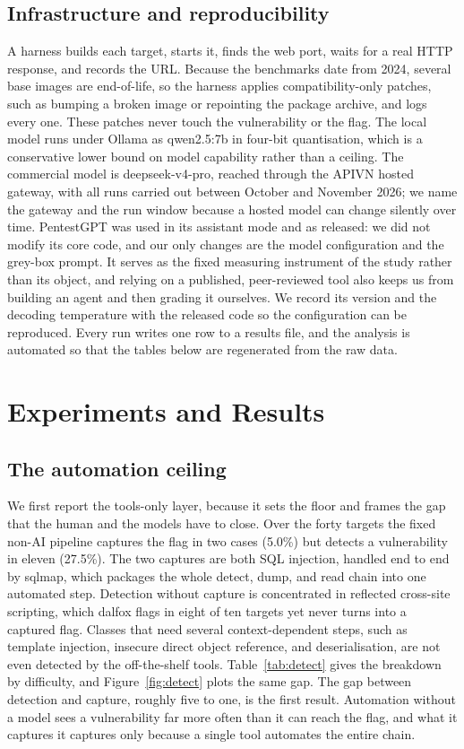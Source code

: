 \documentclass[conference]{IEEEtran}
\begin{document}
\subsection{Infrastructure and reproducibility}
A harness builds each target, starts it, finds the web port, waits for a real HTTP response, and records the URL. Because the benchmarks date from 2024, several base images are end-of-life, so the harness applies compatibility-only patches, such as bumping a broken image or repointing the package archive, and logs every one. These patches never touch the vulnerability or the flag. The local model runs under Ollama as qwen2.5:7b in four-bit quantisation, which is a conservative lower bound on model capability rather than a ceiling. The commercial model is deepseek-v4-pro, reached through the APIVN hosted gateway, with all runs carried out between October and November 2026; we name the gateway and the run window because a hosted model can change silently over time. PentestGPT was used in its assistant mode and as released: we did not modify its core code, and our only changes are the model configuration and the grey-box prompt. It serves as the fixed measuring instrument of the study rather than its object, and relying on a published, peer-reviewed tool also keeps us from building an agent and then grading it ourselves. We record its version and the decoding temperature with the released code so the configuration can be reproduced. Every run writes one row to a results file, and the analysis is automated so that the tables below are regenerated from the raw data.

\section{Experiments and Results}

\subsection{The automation ceiling}
We first report the tools-only layer, because it sets the floor and frames the gap that the human and the models have to close. Over the forty targets the fixed non-AI pipeline captures the flag in two cases (5.0\%) but detects a vulnerability in eleven (27.5\%). The two captures are both SQL injection, handled end to end by sqlmap, which packages the whole detect, dump, and read chain into one automated step. Detection without capture is concentrated in reflected cross-site scripting, which dalfox flags in eight of ten targets yet never turns into a captured flag. Classes that need several context-dependent steps, such as template injection, insecure direct object reference, and deserialisation, are not even detected by the off-the-shelf tools. Table~\ref{tab:detect} gives the breakdown by difficulty, and Figure~\ref{fig:detect} plots the same gap. The gap between detection and capture, roughly five to one, is the first result. Automation without a model sees a vulnerability far more often than it can reach the flag, and what it captures it captures only because a single tool automates the entire chain.
\end{document}
